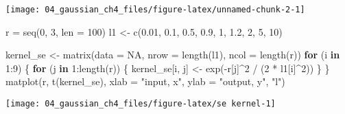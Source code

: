 \documentclass[
]{article}
\newenvironment{Shaded}{\begin{snugshade}}{\end{snugshade}}
\newcommand{\AttributeTok}[1]{\textcolor[rgb]{0.77,0.63,0.00}{#1}}
\newcommand{\ConstantTok}[1]{\textcolor[rgb]{0.00,0.00,0.00}{#1}}
\newcommand{\ControlFlowTok}[1]{\textcolor[rgb]{0.13,0.29,0.53}{\textbf{#1}}}
\newcommand{\DecValTok}[1]{\textcolor[rgb]{0.00,0.00,0.81}{#1}}
\newcommand{\FloatTok}[1]{\textcolor[rgb]{0.00,0.00,0.81}{#1}}
\newcommand{\FunctionTok}[1]{\textcolor[rgb]{0.00,0.00,0.00}{#1}}
\newcommand{\NormalTok}[1]{#1}
\newcommand{\OtherTok}[1]{\textcolor[rgb]{0.56,0.35,0.01}{#1}}
\newcommand{\SpecialCharTok}[1]{\textcolor[rgb]{0.00,0.00,0.00}{#1}}
\newcommand{\StringTok}[1]{\textcolor[rgb]{0.31,0.60,0.02}{#1}}
\begin{document}
\begin{center}\texttt{[image: 04\_gaussian\_ch4\_files/figure-latex/unnamed-chunk-2-1]} \end{center}

\begin{Shaded}
\begin{Highlighting}[]
\NormalTok{r }\OtherTok{=} \FunctionTok{seq}\NormalTok{(}\DecValTok{0}\NormalTok{, }\DecValTok{3}\NormalTok{, }\AttributeTok{len =} \DecValTok{100}\NormalTok{)}
\NormalTok{l1 }\OtherTok{\textless{}{-}} \FunctionTok{c}\NormalTok{(}\FloatTok{0.01}\NormalTok{, }\FloatTok{0.1}\NormalTok{,  }\FloatTok{0.5}\NormalTok{,}
         \FloatTok{0.9}\NormalTok{,   }\DecValTok{1}\NormalTok{,  }\FloatTok{1.2}\NormalTok{, }
           \DecValTok{2}\NormalTok{,   }\DecValTok{5}\NormalTok{,  }\DecValTok{10}\NormalTok{)}

\NormalTok{kernel\_se }\OtherTok{\textless{}{-}} \FunctionTok{matrix}\NormalTok{(}\AttributeTok{data =} \ConstantTok{NA}\NormalTok{, }\AttributeTok{nrow =} \FunctionTok{length}\NormalTok{(l1), }\AttributeTok{ncol =} \FunctionTok{length}\NormalTok{(r))}
\ControlFlowTok{for}\NormalTok{ (i }\ControlFlowTok{in} \DecValTok{1}\SpecialCharTok{:}\DecValTok{9}\NormalTok{) \{}
  \ControlFlowTok{for}\NormalTok{ (j }\ControlFlowTok{in} \DecValTok{1}\SpecialCharTok{:}\FunctionTok{length}\NormalTok{(r)) \{}
\NormalTok{    kernel\_se[i, j] }\OtherTok{\textless{}{-}} \FunctionTok{exp}\NormalTok{(}\SpecialCharTok{{-}}\NormalTok{r[j]}\SpecialCharTok{\^{}}\DecValTok{2} \SpecialCharTok{/}\NormalTok{ (}\DecValTok{2} \SpecialCharTok{*}\NormalTok{ l1[i]}\SpecialCharTok{\^{}}\DecValTok{2}\NormalTok{))}
\NormalTok{  \}}
\NormalTok{\}}
\FunctionTok{matplot}\NormalTok{(r, }\FunctionTok{t}\NormalTok{(kernel\_se), }
        \AttributeTok{xlab =} \StringTok{"input, x"}\NormalTok{, }\AttributeTok{ylab =} \StringTok{"output, y"}\NormalTok{,}
        \StringTok{"l"}\NormalTok{)}
\end{Highlighting}
\end{Shaded}

\begin{center}\texttt{[image: 04\_gaussian\_ch4\_files/figure-latex/se kernel-1]} \end{center}
\end{document}
